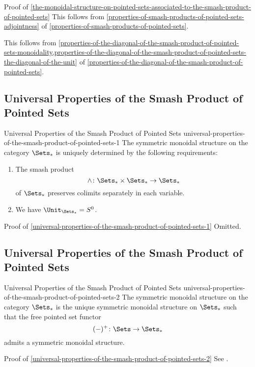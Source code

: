 \begin{Proof}{Proof of \cref{the-monoidal-structure-on-pointed-sets-associated-to-the-smash-product-of-pointed-sets}}
    This follows from \cref{properties-of-smash-products-of-pointed-sets-adjointness} of \cref{properties-of-smash-products-of-pointed-sets}.

    This follows from \cref{properties-of-the-diagonal-of-the-smash-product-of-pointed-sets-monoidality,properties-of-the-diagonal-of-the-smash-product-of-pointed-sets-the-diagonal-of-the-unit} of \cref{properties-of-the-diagonal-of-the-smash-product-of-pointed-sets}.
\end{Proof}
\subsection{Universal Properties of the Smash Product of Pointed Sets \rmI}\label{subsection-universal-properties-of-the-smash-product-of-pointed-sets-1}
\begin{theorem}{Universal Properties of the Smash Product of Pointed Sets \rmI}{universal-properties-of-the-smash-product-of-pointed-sets-1}%
    The symmetric monoidal structure on the category $\Sets_{*}$ is uniquely determined by the following requirements:
    \begin{enumerate}%
        \item{}The smash product
            \[
                \wedge
                \colon
                \Sets_{*}\times\Sets_{*}
                \to
                \Sets_{*}
            \]%
            of $\Sets_{*}$ preserves colimits separately in each variable.
        \item{}We have $\Unit_{\Sets_{*}}=S^{0}$.
    \end{enumerate}%
\end{theorem}
\begin{Proof}{Proof of \cref{universal-properties-of-the-smash-product-of-pointed-sets-1}}%
    Omitted.
\end{Proof}
\subsection{Universal Properties of the Smash Product of Pointed Sets \rmII}\label{subsection-universal-properties-of-the-smash-product-of-pointed-sets-2}
\begin{theorem}{Universal Properties of the Smash Product of Pointed Sets \rmII}{universal-properties-of-the-smash-product-of-pointed-sets-2}%
    The symmetric monoidal structure on the category $\Sets_{*}$ is the unique symmetric monoidal structure on $\Sets_{*}$ such that the free pointed set functor
    \[
        (-)^{+}
        \colon
        \Sets
        \to
        \Sets_{*}
    \]%
    admits a symmetric monoidal structure.
\end{theorem}
\begin{Proof}{Proof of \cref{universal-properties-of-the-smash-product-of-pointed-sets-2}}%
    See \cite[Theorem 5.1]{universality-of-multiplicative-infinite-loop-space-machines}.
\end{Proof}
